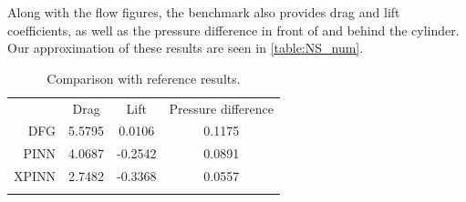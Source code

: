 Along with the flow figures, the benchmark also provides drag and lift coefficients, as well as the pressure difference in front of and behind the cylinder. Our approximation of these results are seen in \autoref{table:NS_num}.

\begin{table}[h!]
\centering
\caption{Comparison with reference results.}
\begin{tabular}{r|c|c|c}
    \toprule
     & \hspace{5mm} Drag \hspace{5mm} & \hspace{5mm} Lift \hspace{5mm} & Pressure difference  \\
    \colrule
    DFG & 5.5795 &  0.0106 & 0.1175 \\
    PINN & 4.0687  &  -0.2542 & 0.0891 \\
    XPINN & 2.7482 & -0.3368 & 0.0557 \\
    \botrule
\end{tabular}
\label{table:NS_num}
\end{table}

\vfill\null




